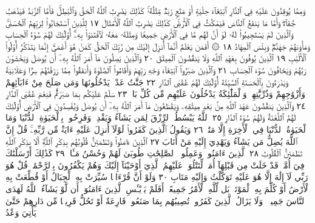 وَمِمَّا يُوقِدُونَ عَلَيْهِ فِي ٱلنَّارِ ٱبْتِغَآءَ حِلْيَةٍ أَوْ مَتَٰعࣲ زَبَدࣱ مِّثْلُهُۥۚ
كَذَٰلِكَ يَضْرِبُ ٱللَّهُ ٱلْحَقَّ وَٱلْبَٰطِلَۚ فَأَمَّا ٱلزَّبَدُ فَيَذْهَبُ جُفَآءࣰۖ
وَأَمَّا مَا يَنفَعُ ٱلنَّاسَ فَيَمْكُثُ فِي ٱلْأَرْضِۚ كَذَٰلِكَ يَضْرِبُ ٱللَّهُ
ٱلْأَمْثَالَ ١٧ لِلَّذِينَ ٱسْتَجَابُوا۟ لِرَبِّهِمُ ٱلْحُسْنَىٰۚ وَٱلَّذِينَ لَمْ يَسْتَجِيبُوا۟
لَهُۥ لَوْ أَنَّ لَهُم مَّا فِي ٱلْأَرْضِ جَمِيعࣰا وَمِثْلَهُۥ مَعَهُۥ لَٱفْتَدَوْا۟ بِهِۦٓۚ
أُو۟لَٰٓئِكَ لَهُمْ سُوٓءُ ٱلْحِسَابِ وَمَأْوَىٰهُمْ جَهَنَّمُۖ وَبِئْسَ ٱلْمِهَادُ ١٨
۞ أَفَمَن يَعْلَمُ أَنَّمَآ أُنزِلَ إِلَيْكَ مِن رَّبِّكَ ٱلْحَقُّ كَمَنْ هُوَ أَعْمَىٰٓۚ إِنَّمَا يَتَذَكَّرُ
أُو۟لُوا۟ ٱلْأَلْبَٰبِ ١٩ ٱلَّذِينَ يُوفُونَ بِعَهْدِ ٱللَّهِ وَلَا يَنقُضُونَ ٱلْمِيثَٰقَ ٢٠
وَٱلَّذِينَ يَصِلُونَ مَآ أَمَرَ ٱللَّهُ بِهِۦٓ أَن يُوصَلَ وَيَخْشَوْنَ رَبَّهُمْ
وَيَخَافُونَ سُوٓءَ ٱلْحِسَابِ ٢١ وَٱلَّذِينَ صَبَرُوا۟ ٱبْتِغَآءَ وَجْهِ رَبِّهِمْ
وَأَقَامُوا۟ ٱلصَّلَوٰةَ وَأَنفَقُوا۟ مِمَّا رَزَقْنَٰهُمْ سِرࣰّا وَعَلَانِيَةࣰ وَيَدْرَءُونَ
بِٱلْحَسَنَةِ ٱلسَّيِّئَةَ أُو۟لَٰٓئِكَ لَهُمْ عُقْبَى ٱلدَّارِ ٢٢ جَنَّٰتُ عَدْنࣲ يَدْخُلُونَهَا
وَمَن صَلَحَ مِنْ ءَابَآئِهِمْ وَأَزْوَٰجِهِمْ وَذُرِّيَّٰتِهِمْۖ وَٱلْمَلَٰٓئِكَةُ يَدْخُلُونَ
عَلَيْهِم مِّن كُلِّ بَابࣲ ٢٣ سَلَٰمٌ عَلَيْكُم بِمَا صَبَرْتُمْۚ فَنِعْمَ عُقْبَى ٱلدَّارِ ٢٤
وَٱلَّذِينَ يَنقُضُونَ عَهْدَ ٱللَّهِ مِنۢ بَعْدِ مِيثَٰقِهِۦ وَيَقْطَعُونَ
مَآ أَمَرَ ٱللَّهُ بِهِۦٓ أَن يُوصَلَ وَيُفْسِدُونَ فِي ٱلْأَرْضِ أُو۟لَٰٓئِكَ لَهُمُ
ٱللَّعْنَةُ وَلَهُمْ سُوٓءُ ٱلدَّارِ ٢٥ ٱللَّهُ يَبْسُطُ ٱلرِّزْقَ لِمَن يَشَآءُ
وَيَقْدِرُۚ وَفَرِحُوا۟ بِٱلْحَيَوٰةِ ٱلدُّنْيَا وَمَا ٱلْحَيَوٰةُ ٱلدُّنْيَا فِي ٱلْأٓخِرَةِ إِلَّا
مَتَٰعࣱ ٢٦ وَيَقُولُ ٱلَّذِينَ كَفَرُوا۟ لَوْلَآ أُنزِلَ عَلَيْهِ ءَايَةࣱ مِّن رَّبِّهِۦۚ قُلْ
إِنَّ ٱللَّهَ يُضِلُّ مَن يَشَآءُ وَيَهْدِيٓ إِلَيْهِ مَنْ أَنَابَ ٢٧ ٱلَّذِينَ ءَامَنُوا۟
وَتَطْمَئِنُّ قُلُوبُهُم بِذِكْرِ ٱللَّهِۗ أَلَا بِذِكْرِ ٱللَّهِ تَطْمَئِنُّ ٱلْقُلُوبُ ٢٨
ٱلَّذِينَ ءَامَنُوا۟ وَعَمِلُوا۟ ٱلصَّٰلِحَٰتِ طُوبَىٰ لَهُمْ وَحُسْنُ مَـَٔابࣲ ٢٩
كَذَٰلِكَ أَرْسَلْنَٰكَ فِيٓ أُمَّةࣲ قَدْ خَلَتْ مِن قَبْلِهَآ أُمَمࣱ لِّتَتْلُوَا۟
عَلَيْهِمُ ٱلَّذِيٓ أَوْحَيْنَآ إِلَيْكَ وَهُمْ يَكْفُرُونَ بِٱلرَّحْمَٰنِۚ قُلْ هُوَ رَبِّي
لَآ إِلَٰهَ إِلَّا هُوَ عَلَيْهِ تَوَكَّلْتُ وَإِلَيْهِ مَتَابِ ٣٠ وَلَوْ أَنَّ قُرْءَانࣰا
سُيِّرَتْ بِهِ ٱلْجِبَالُ أَوْ قُطِّعَتْ بِهِ ٱلْأَرْضُ أَوْ كُلِّمَ بِهِ ٱلْمَوْتَىٰۗ
بَل لِّلَّهِ ٱلْأَمْرُ جَمِيعًاۗ أَفَلَمْ يَا۟يْـَٔسِ ٱلَّذِينَ ءَامَنُوٓا۟ أَن لَّوْ يَشَآءُ
ٱللَّهُ لَهَدَى ٱلنَّاسَ جَمِيعࣰاۗ وَلَا يَزَالُ ٱلَّذِينَ كَفَرُوا۟ تُصِيبُهُم
بِمَا صَنَعُوا۟ قَارِعَةٌ أَوْ تَحُلُّ قَرِيبࣰا مِّن دَارِهِمْ حَتَّىٰ يَأْتِيَ وَعْدُ
